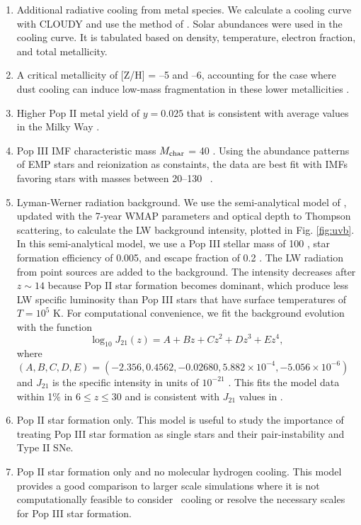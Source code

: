 \documentclass[useAMS,usenatbib]{mn2e}
\begin{document}
\begin{enumerate}
\item Additional radiative cooling from metal species.  We calculate a
  cooling curve with CLOUDY \citep{CLOUDY} and use the method of
  \citep{2008MNRAS.385.1443S}.  Solar abundances were used in the
  cooling curve.  It is tabulated based on density, temperature,
  electron fraction, and total metallicity.
\item A critical metallicity of [Z/H] = --5 and --6, accounting for
  the case where dust cooling can induce low-mass fragmentation in
  these lower metallicities \citep{Omukai05, Schneider06_Frag}.
\item Higher Pop II metal yield of $y = 0.025$ that is consistent with
  average values in the Milky Way \citep{Madau96}.
\item Pop III IMF characteristic mass $M_{\rm char}$ = 40 \Ms.  Using
  the abundance patterns of EMP stars and reionization as constaints,
  the data are best fit with IMFs favoring stars with masses between
  20--130 \Ms~\citep{Umeda03, Tumlinson06}.
\item Lyman-Werner radiation background.  We use the semi-analytical
  model of \citet{Wise05}, updated with the 7-year WMAP parameters and
  optical depth to Thompson scattering, to calculate the LW background
  intensity, plotted in Fig. \ref{fig:uvb}.  In this semi-analytical
  model, we use a Pop III stellar mass of 100 \Ms, star formation
  efficiency of 0.005, and escape fraction of 0.2 \citep{Wise09}.  The
  LW radiation from point sources are added to the background.  The
  intensity decreases after $z \sim 14$ because Pop II star formation
  becomes dominant, which produce less LW specific luminosity than Pop
  III stars that have surface temperatures of $T = 10^5$ K.  For
  computational convenience, we fit the background evolution with the
  function
%
  \begin{equation}
    \label{eqn:uvb}
    \log_{10} J_{21}(z) = A + Bz + Cz^2 + Dz^3 + Ez^4,
  \end{equation}
%
  where $(A,B,C,D,E) = (-2.356, 0.4562, -0.02680, 5.882 \times 10^{-4},
  -5.056 \times 10^{-6})$ and $J_{21}$ is the specific intensity in
  units of $10^{-21}$ \emis.  This fits the
  model data within 1\% in $6 \le z \le 30$ and is consistent with
  $J_{21}$ values in \citet{Trenti09_SFR}.
\item Pop II star formation only.  This model is useful to study the
  importance of treating Pop III star formation as single stars and
  their pair-instability and Type II SNe.
\item Pop II star formation only and no molecular hydrogen cooling.
  This model provides a good comparison to larger scale simulations
  where it is not computationally feasible to consider \hh~cooling or
  resolve the necessary scales for Pop III star formation.
\end{enumerate}
\end{document}
